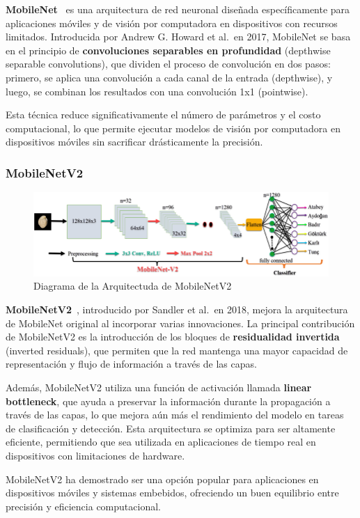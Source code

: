 \textbf{MobileNet}~\cite{howardMobileNetsEfficientConvolutional2017} es una arquitectura de red neuronal diseñada específicamente para
aplicaciones móviles y de visión por computadora en dispositivos con recursos limitados.
Introducida por Andrew G. Howard et al.\ en 2017, MobileNet se basa en el principio de
\textbf{convoluciones separables en profundidad} (depthwise separable convolutions), que dividen el proceso de
convolución en dos pasos: primero, se aplica una convolución a cada canal de la entrada (depthwise), y luego, se
combinan los resultados con una convolución 1x1 (pointwise).


Esta técnica reduce significativamente el número de parámetros y el costo computacional, lo que permite ejecutar
modelos de visión por computadora en dispositivos móviles sin sacrificar drásticamente la precisión.

\subsubsection{MobileNetV2}\label{subsubsec:mobilenetv2}

\begin{figure}[htp] \label{fig:mobilenetv2}
    \begin{center}
        \includegraphics[width=1\textwidth]{imagenes/mobilenetv2}
    \end{center}
    \caption[MobileNetV2]{Diagrama de la Arquitectuda de MobileNetV2}
\end{figure}

\textbf{MobileNetV2}~\cite{sandlerMobileNetV2InvertedResiduals2019}, introducido por Sandler et al.\ en 2018, mejora la arquitectura
de MobileNet original al incorporar varias innovaciones.
La principal contribución de MobileNetV2 es la introducción de los bloques de \textbf{residualidad invertida} (inverted
residuals), que permiten que la red mantenga una mayor capacidad de representación y flujo de información a través de
las capas.


Además, MobileNetV2 utiliza una función de activación llamada \textbf{linear bottleneck}, que ayuda a preservar la
información durante la propagación a través de las capas, lo que mejora aún más el rendimiento del modelo en tareas de
clasificación y detección.
Esta arquitectura se optimiza para ser altamente eficiente, permitiendo que sea utilizada en aplicaciones de tiempo
real en dispositivos con limitaciones de hardware.


MobileNetV2 ha demostrado ser una opción popular para aplicaciones en dispositivos móviles y sistemas embebidos,
ofreciendo un buen equilibrio entre precisión y eficiencia computacional.
